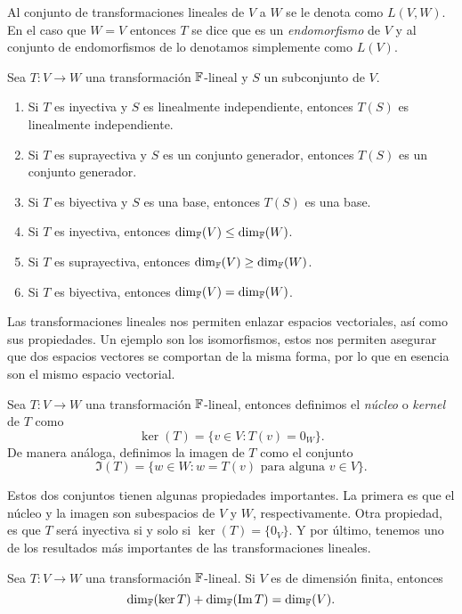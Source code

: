 Al conjunto de transformaciones lineales de $V$ a $W$ se le denota como $L(V,W)$. En el caso que $W = V$ entonces $T$ se dice que es un \emph{endomorfismo} de $V$ y al conjunto de endomorfismos de lo denotamos simplemente como $L(V)$.

\begin{teor}
  Sea $T\colon V \to W$ una transformación $\mathbb{F}$-lineal y $S$ un subconjunto de $V$.
  \begin{enumerate}
    \item Si $T$ es inyectiva y $S$ es linealmente independiente, entonces $T(S)$ es linealmente independiente.
    \item Si $T$ es suprayectiva y $S$ es un conjunto generador, entonces $T(S)$ es un conjunto generador.
    \item Si $T$ es biyectiva y $S$ es una base, entonces $T(S)$ es una base.
    \item Si $T$ es inyectiva, entonces $\dim_{\mathbb{F}} (V) \leq \dim_{\mathbb{F}}(W)$.
    \item Si $T$ es suprayectiva, entonces $\dim_{\mathbb{F}} (V) \geq \dim_{\mathbb{F}}(W)$.
    \item Si $T$ es biyectiva, entonces $\dim_{\mathbb{F}} (V) = \dim_{\mathbb{F}}(W)$.
  \end{enumerate}
\end{teor}

Las transformaciones lineales nos permiten enlazar espacios vectoriales, así como sus propiedades. Un ejemplo son los isomorfismos, estos nos permiten asegurar que dos espacios vectores se comportan de la misma forma, por lo que en esencia son el mismo espacio vectorial.

\begin{defi}
  Sea $T\colon V \to W$ una transformación $\mathbb{F}$-lineal, entonces definimos el \emph{núcleo} o \emph{kernel}  de $T$ como
    \[ \ker(T) = \{ v \in V : T(v) = 0_W \}.\]
  De manera análoga, definimos la imagen de $T$ como el conjunto
    \[ \Im(T) = \{w \in W : w = T(v) \text{ para alguna } v \in V \}. \]
\end{defi}

Estos dos conjuntos tienen algunas propiedades importantes. La primera es que el núcleo y la imagen son subespacios de $V$ y $W$, respectivamente. Otra propiedad, es que $T$ será inyectiva si y solo si $\ker(T) = \{0_V\}$. Y por último, tenemos uno de los resultados más importantes de las transformaciones lineales.
\begin{teor}
  Sea $T \colon V \to W$ una transformación $\mathbb{F}$-lineal. Si $V$ es de dimensión finita, entonces
    \[  \dim_{\mathbb{F}}( \ker T )  + \dim_{\mathbb{F}}( \operatorname{Im} T) = \dim_{\mathbb{F}} (V). \]
\end{teor}